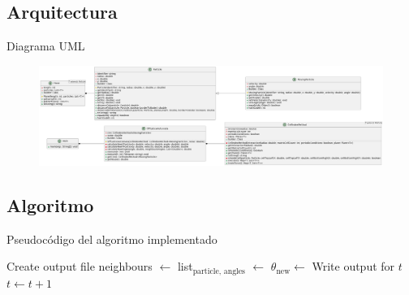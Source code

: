 \documentclass{beamer}
\begin{document}
        \subsection{Arquitectura}

            \begin{frame}{Diagrama UML}
                \begin{figure}[htbp]
                    \centering
                    \includegraphics[width=\textwidth]{./architecture-landscape}
                    \label{fig:architecture}
                \end{figure}
            \end{frame}

        \subsection{Algoritmo}

            \begin{frame}{Pseudocódigo del algoritmo implementado}{}
                    \begin{algorithmic}[1]
                        \ttfamily \footnotesize
                        \State Create output file
                            \State neighbours $\gets$ 
                            \State list$_{\text{particle, angles}}$ $\gets$ 
                                \State $\theta_{\text{new}} \gets$ 
                                \State {}
                                \State {}
                                \State {}
                                \State Write output for $t$
                            \EndFor
                            \State $t \gets t + 1$
                        \EndWhile
                    \end{algorithmic}
            \end{frame}
\end{document}
